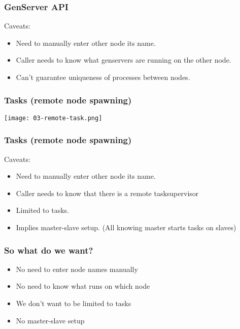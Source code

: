 \begin{frame}
    \frametitle{GenServer API}
    Caveats: 
    \begin{itemize}
        \item Need to manually enter other node its name.
        \item Caller needs to know what genservers are running on the other node.
        \item Can't guarantee uniqueness of processes between nodes.
    \end{itemize}
\end{frame}


\begin{frame}
    \frametitle{Tasks (remote node spawning)}
    \begin{center}
        \texttt{[image: 03-remote-task.png]}
    \end{center}
\end{frame}

\begin{frame}
    \frametitle{Tasks (remote node spawning)}
    Caveats: 
    \begin{itemize}
        \item Need to manually enter other node its name.
        \item Caller needs to know that there is a remote tasksupervisor
        \item Limited to tasks.
        \item Implies master-slave setup. (All knowing master starts tasks on slaves)
    \end{itemize}
\end{frame}

\begin{frame}
    \frametitle{So what do we want?}
    \begin{itemize}
        \item No need to enter node names manually
        \item No need to know what runs on which node
        \item We don't want to be limited to tasks
        \item No master-slave setup
    \end{itemize}
\end{frame}


